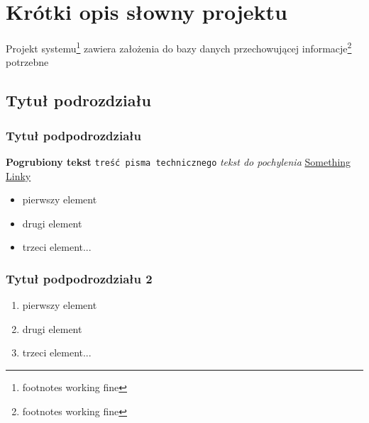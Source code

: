 \section{Krótki opis słowny projektu}
Projekt systemu\footnote{footnotes working fine} zawiera założenia do bazy danych przechowującej informacje\footnote{footnotes working fine} potrzebne

\subsection{Tytuł podrozdziału} 
\subsubsection{Tytuł podpodrozdziału}
\textbf{Pogrubiony tekst}
\texttt{treść pisma technicznego}
\textsl{tekst do pochylenia}
\href{http://www.sharelatex.com}{Something 
Linky}
 
\begin{itemize}
\item pierwszy element
\item drugi element
\item trzeci element...
\end{itemize}

\subsubsection{Tytuł podpodrozdziału 2}
\begin{enumerate}
\item pierwszy element
\item drugi element
\item trzeci element...
\end{enumerate}
